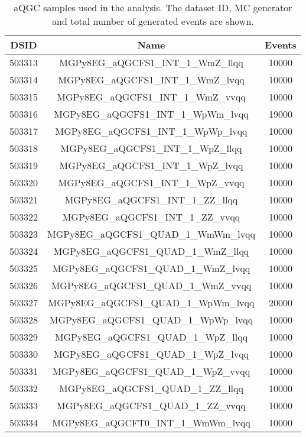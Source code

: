 \begin{table}[!htbp]
\begin{center}
\small
\caption{
aQGC samples used in the analysis. The dataset ID, MC generator and total number of generated events are shown.
}
\begin{tabular}{c|c|c}
\hline

\hline
DSID & Name & Events  \\
\hline

503313 & MGPy8EG\_aQGCFS1\_INT\_1\_WmZ\_llqq     & 10000 \\
503314 & MGPy8EG\_aQGCFS1\_INT\_1\_WmZ\_lvqq     & 10000 \\
503315 & MGPy8EG\_aQGCFS1\_INT\_1\_WmZ\_vvqq     & 10000 \\
503316 & MGPy8EG\_aQGCFS1\_INT\_1\_WpWm\_lvqq    & 19000 \\
503317 & MGPy8EG\_aQGCFS1\_INT\_1\_WpWp\_lvqq    & 10000 \\
503318 & MGPy8EG\_aQGCFS1\_INT\_1\_WpZ\_llqq     & 10000 \\
503319 & MGPy8EG\_aQGCFS1\_INT\_1\_WpZ\_lvqq     & 10000 \\
503320 & MGPy8EG\_aQGCFS1\_INT\_1\_WpZ\_vvqq     & 10000 \\
503321 & MGPy8EG\_aQGCFS1\_INT\_1\_ZZ\_llqq      & 10000 \\
503322 & MGPy8EG\_aQGCFS1\_INT\_1\_ZZ\_vvqq      & 10000 \\
503323 & MGPy8EG\_aQGCFS1\_QUAD\_1\_WmWm\_lvqq   & 10000 \\
503324 & MGPy8EG\_aQGCFS1\_QUAD\_1\_WmZ\_llqq    & 10000 \\
503325 & MGPy8EG\_aQGCFS1\_QUAD\_1\_WmZ\_lvqq    & 10000 \\
503326 & MGPy8EG\_aQGCFS1\_QUAD\_1\_WmZ\_vvqq    & 10000 \\
503327 & MGPy8EG\_aQGCFS1\_QUAD\_1\_WpWm\_lvqq   & 20000 \\
503328 & MGPy8EG\_aQGCFS1\_QUAD\_1\_WpWp\_lvqq   & 10000 \\
503329 & MGPy8EG\_aQGCFS1\_QUAD\_1\_WpZ\_llqq    & 10000 \\
503330 & MGPy8EG\_aQGCFS1\_QUAD\_1\_WpZ\_lvqq    & 10000 \\
503331 & MGPy8EG\_aQGCFS1\_QUAD\_1\_WpZ\_vvqq    & 10000 \\
503332 & MGPy8EG\_aQGCFS1\_QUAD\_1\_ZZ\_llqq     & 10000 \\
503333 & MGPy8EG\_aQGCFS1\_QUAD\_1\_ZZ\_vvqq     & 10000 \\
503334 & MGPy8EG\_aQGCFT0\_INT\_1\_WmWm\_lvqq    & 10000 \\

\end{tabular}
\end{center}
\end{table}
